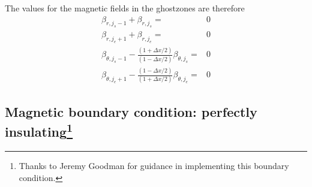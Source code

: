 \documentclass[letterpaper]{article}
\begin{document}
The values for the magnetic fields in the ghostzones are therefore
\begin{align}
\beta_{r, j_s-1} + \beta_{r, j_s} =& 0
\\
\beta_{r, j_e+1} + \beta_{r, j_e} =& 0
\\
\beta_{\theta, j_s-1} -
 \frac{(1 + \Delta x/2)}{(1 - \Delta x/2)}\beta_{\theta, j_s} =& 0
\\
\beta_{\theta, j_e+1} -
 \frac{(1 - \Delta x/2)}{(1 + \Delta x/2)}\beta_{\theta, j_e} =& 0
\end{align}

\subsection[Magnetic boundary condition: perfectly insulating]{Magnetic
boundary condition: perfectly
insulating\protect\footnote{Thanks to Jeremy Goodman for guidance in
implementing this boundary condition.}}
\end{document}

